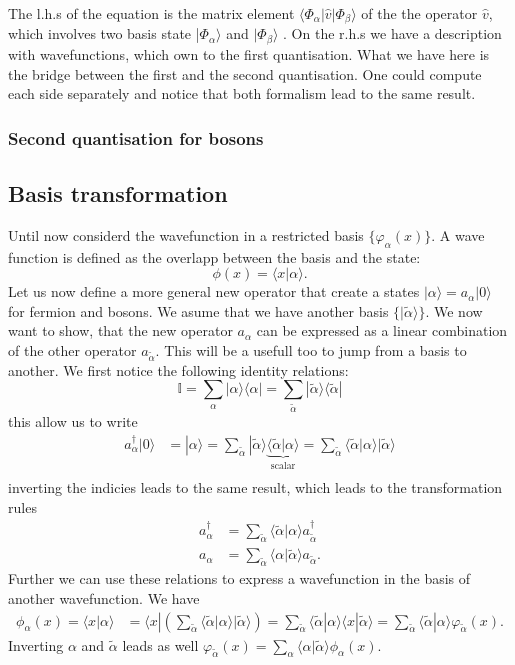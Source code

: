 \documentclass[../main.tex]{subfile}
\begin{document}
The l.h.s of the equation is the matrix element $\langle\Phi_{\alpha}|\hat{v}|\Phi_{\beta}\rangle$ of the the operator
 $\hat{v}$, which involves two basis state |$\Phi_{\alpha}\rangle$ and $|\Phi_{\beta}\rangle$ .
On the r.h.s we have a description with wavefunctions, which own to the first quantisation. What we have here
is the bridge between the first and the second quantisation. One could compute each side separately and notice
that both formalism lead to the same result.

\subsubsection{Second quantisation for bosons}
\subsection{Basis transformation}
Until now considerd the wavefunction in a restricted basis $\{\varphi_{\alpha}(x)\}$. A wave function is defined as the overlapp between the basis and the state:
\[
    \phi(x) = \langle x | \alpha \rangle.
\]
Let us now define a more general new operator that create a states $|\alpha\rangle = a_{\alpha}|0\rangle$ for fermion and bosons.
We asume that we have another basis $\{|\tilde{\alpha}\rangle\}$.
We now want to show, that the new operator $a_{\alpha}$ can be expressed as a linear combination of the other operator  $a_{\tilde{\alpha}}$. This will be a
usefull too to jump from a basis to another. We first notice the following identity relations:
\[
    \mathbb{I} = \sum_{\alpha} | \alpha \rangle \langle \alpha| = \sum_{\tilde{\alpha}} | \tilde{\alpha} \rangle \langle \tilde{\alpha}| 
\]
this allow us to write 
\begin{align*}  
    a_{\alpha}^{\dagger}|0\rangle &= | \alpha \rangle = \sum_{\tilde{\alpha}}|\tilde{\alpha}\rangle\underbrace{\langle\tilde{\alpha}|\alpha\rangle}_{\text{scalar}} = \sum_{\tilde{\alpha}}\langle\tilde{\alpha}|\alpha\rangle |\tilde{\alpha}\rangle \\
\end{align*}
inverting the indicies leads to the same result, which leads to the transformation rules
\begin{align*}
    a_{\alpha}^{\dagger} &= \sum_{\tilde{\alpha}}\langle\tilde{\alpha}|\alpha\rangle a_{\tilde{\alpha}}^{\dagger}\\
    a_{\alpha} &= \sum_{\tilde{\alpha}}\langle\alpha|\tilde{\alpha}\rangle a_{\tilde{\alpha}}.
\end{align*}
Further we can use these relations to express a wavefunction in the basis of another wavefunction. We have
\begin{align*}
    \phi_{\alpha}(x) = \langle x|\alpha\rangle &= \langle x|\left(\sum_{\tilde{\alpha}} \langle \tilde{\alpha}|\alpha\rangle |\tilde{\alpha}\rangle\right) = \sum_{\tilde{\alpha}}  \langle \tilde{\alpha}|\alpha\rangle\langle x|\tilde{\alpha}\rangle
    = \sum_{\tilde{\alpha}} \langle \tilde{\alpha}|\alpha\rangle \varphi_{\tilde{\alpha}}(x).
\end{align*}
Inverting $\alpha$ and $\tilde{\alpha}$ leads as well $\varphi_{\tilde{\alpha}}(x) = \sum_{\alpha} \langle \alpha|\tilde{\alpha}\rangle \phi_{\alpha}(x)$.\\
\end{document}
